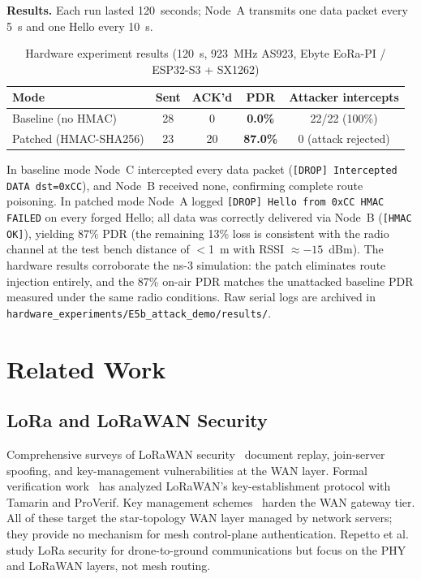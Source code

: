 \documentclass[10pt,journal,compsoc]{IEEEtran}
\begin{document}
\textbf{Results.}
Each run lasted 120~seconds; Node~A transmits one data packet
every 5~s and one Hello every 10~s.

\begin{table}[h]
  \centering
  \caption{Hardware experiment results (120~s, 923~MHz AS923,
           Ebyte EoRa-PI / ESP32-S3 + SX1262)}
  \label{tab:hw-results}
  \begin{tabular}{lcccc}
    \toprule
    \textbf{Mode} & \textbf{Sent} & \textbf{ACK'd} & \textbf{PDR} & \textbf{Attacker intercepts} \\
    \midrule
    Baseline (no HMAC) & 28 & 0  & \textbf{0.0\%}  & 22/22 (100\%) \\
    Patched (HMAC-SHA256)    & 23 & 20 & \textbf{87.0\%} & 0 (attack rejected) \\
    \bottomrule
  \end{tabular}
\end{table}

In baseline mode Node~C intercepted every data packet
(\texttt{[DROP] Intercepted DATA dst=0xCC}), and Node~B
received none, confirming complete route poisoning.
In patched mode Node~A logged \texttt{[DROP] Hello from 0xCC HMAC FAILED}
on every forged Hello; all data was correctly delivered
via Node~B (\texttt{[HMAC OK]}), yielding 87\% PDR
(the remaining 13\% loss is consistent with the radio channel
at the test bench distance of $<$1~m with RSSI $\approx -15$~dBm).
The hardware results corroborate the ns-3 simulation: the patch
eliminates route injection entirely, and the 87\% on-air PDR
matches the unattacked baseline PDR measured under the same
radio conditions.
Raw serial logs are archived in
\texttt{hardware\_experiments/E5b\_attack\_demo/results/}.

\section{Related Work}
\label{sec:related}

\subsection{LoRa and LoRaWAN Security}

Comprehensive surveys of LoRaWAN security~\cite{hessel2022-lorawan-survey,yang2021-lorawan-systematic}
document replay, join-server spoofing, and key-management vulnerabilities
at the WAN layer.
Formal verification work~\cite{ieee2025-lorawan-key-vulnerability,
ieee2025-lorawan-key-verification} has analyzed LoRaWAN's key-establishment
protocol with Tamarin and ProVerif. Key management schemes~\cite{lorawan-key-mgmt-2023,
mohamed2022-lorawan-gateways} harden the WAN gateway tier.
All of these target the star-topology WAN layer managed by network
servers; they provide no mechanism for mesh control-plane authentication.
Repetto et al.~\cite{repetto2025-lorawan-drone-attack} study LoRa
security for drone-to-ground communications but focus on the PHY
and LoRaWAN layers, not mesh routing.
\end{document}

